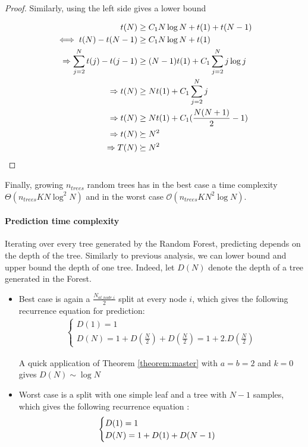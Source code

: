 \documentclass[english,11pt,openany]{report}
\theoremstyle{definition}
\newcommand{\bigO}{\mathcal{O}}
\theoremstyle{plain}
\theoremstyle{definition}
\begin{document}
\begin{appendices}
\begin{proof}
	Similarly, using the left side gives a lower bound 
	
	\begin{align}
	t(N) & \geq C_1 N\log N + t(1) + t(N-1)\notag \\
	\iff t(N) - t(N-1) & \geq C_1 N\log N + t(1) \notag\\
	\Rightarrow \sum_{j=2}^{N}  t(j) - t(j-1) &\geq (N-1)t(1) + C_1\sum_{j=2}^{N}j \log j \notag\\
	\Rightarrow  t(N) &\geq N t(1) + C_1 \sum_{j=2}^{N}j \notag\\
	\Rightarrow  t(N) &\geq Nt(1) + C_1 (\frac{N(N +1)}{2} - 1)\notag \\
	\Rightarrow  t(N) &\succeq N^2 \notag \\
	\Rightarrow  T(N) &\succeq N^2 \notag
	\end{align}
	
\end{proof}

Finally, growing $n_{trees}$ random trees has in the best case a time complexity $\Theta(n_{trees}KN\log^2 N)$ and in the worst case $\bigO (n_{trees} K N^2 \log N)$.

\paragraph{Prediction time complexity}

Iterating over every tree generated by the Random Forest, predicting depends on the depth of the tree. 
Similarly to previous analysis, we can lower bound and upper bound the depth of one tree. 
Indeed, let $D(N)$ denote the depth of a tree generated in the Forest. 

\begin{itemize}
	\item 
	Best case is again a $\frac{N_{at\_node\_i}}{2}$ split at every node $i$,  which gives the following recurrence equation for prediction: 
	\begin{align}
	\begin{cases}
	D(1) = 1 \\
	D(N) = 1 + D(\frac{N}{2}) + D(\frac{N}{2}) = 1 + 2.D(\frac{N}{2})
	\end{cases}
	\end{align}
	
	A quick application of Theorem \ref{theorem:master} with $a=b=2$ and $k=0$ gives $D(N)\sim \log N$
	
	\item Worst case is a split with one simple leaf and a tree with $N-1$ samples, which gives the following recurrence equation : 
	\begin{align}
	\begin{cases}
	D(1) = 1 \\
	D(N) = 1 + D(1) + D(N-1) \notag
	\end{cases}
	\end{align}
	

\end{itemize}
\end{appendices}
\end{document}
